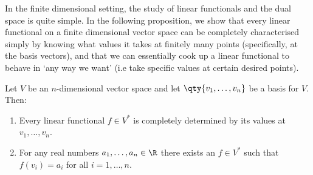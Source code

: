 In the finite dimensional setting, the study of linear functionals and the dual space is quite simple. In the following proposition, we show that every linear functional on a finite dimensional vector space can be completely characterised simply by knowing what values it takes at finitely many points (specifically, at the basis vectors), and that we can essentially cook up a linear functional to behave in `any way we want' (i.e take specific values at certain desired points).
  \begin{proposition}
    \label{thm:dualprops}
  Let \( V \) be an \( n \)-dimensional vector space and let \( \qty{v_1,\dots,v_n} \) be a basis for \( V \). Then: 
  \begin{enumerate}[label=(\alph*)]
  \item Every linear functional \( f\in V^* \) is completely determined by its values at \( v_1,\dots,v_n \).
  \item For any real numbers \( a_1,\dots, a_n\in\R \) there exists an \( f\in V^* \) such that \( f(v_i)=a_i \) for all \( i=1,\dots,n \).
  \end{enumerate}
\end{proposition}
